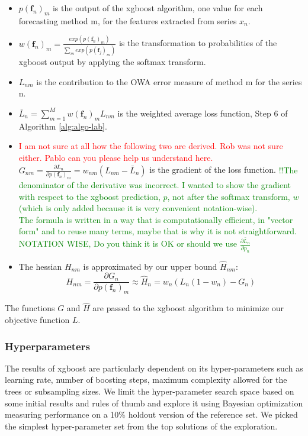 \documentclass[11pt,a4paper,]{article}
\providecommand{\tightlist}{%
  \setlength{\itemsep}{0pt}\setlength{\parskip}{0pt}}
\theoremstyle{definition}
\theoremstyle{definition}
\theoremstyle{definition}
\theoremstyle{remark}
\begin{document}
\begin{itemize}
\tightlist
\item
  \(p(\bm{f}_n)_m\) is the output of the xgboost algorithm, one value
  for each forecasting method m, for the features extracted from series
  \(x_n\).
\item
  \(w(\bm{f}_n)_{m} = \frac{exp(p(\bm{f}_n)_m)}{ \sum_m exp(p(\bm{f}_j)_m)}\)
  is the transformation to probabilities of the xgboost output by
  applying the softmax transform.
\item
  \(L_{nm}\) is the contribution to the OWA error measure of method m
  for the series n.
\item
  \(\bar{L}_n = \sum_{m=1}^M w(\bm{f}_n)_m L_{nm}\) is the weighted
  average loss function, Step 6 of Algorithm \ref{alg:algo-lab}.
\item
  \textcolor{red}{I am not sure at all how the following two are derived. Rob was not sure either. Pablo can you please help us understand here.}
  \(G_{nm} = \frac{\partial{\bar{L}_n}}{\partial{p(\bm{f}_n)_m}} = w_{nm}(L_{nm} - \bar{L}_n)\)
  is the gradient of the loss function.
  \textcolor{green}{!!The denominator of the derivative was incorrect. I wanted to show the gradient with respect to the xgboost prediction, $p$, not after the softmax transform, $w$ (which is only added because it is very convenient notation-wise).
    \\The formula is written in a way that is computationally efficient, in "vector form" and to reuse many terms, maybe that is why it is not straightforward.
    \\ NOTATION WISE, Do you think it is OK or should we use
    $\frac{\partial{\bar{L}_n}}{\partial{p_n}}$}
\item
  The hessian \(H_{nm}\) is approximated by our upper bound
  \(\hat{H}_{nm}\):
  \[ H_{nm} = \frac{\partial{G_n}}{\partial{p(\bm{f}_n)_m}} \approx \hat{H}_n = w_n(L_n(1-w_n) - G_n)  \]
\end{itemize}

The functions \(G\) and \(\hat{H}\) are passed to the xgboost algorithm
to minimize our objective function \(L\).

\subsubsection{Hyperparameters}\label{hyperparameters}

The results of xgboost are particularly dependent on its
hyper-parameters such as learning rate, number of boosting steps,
maximum complexity allowed for the trees or subsampling sizes. We limit
the hyper-parameter search space based on some initial results and rules
of thumb and explore it using Bayesian optimization
\autocite[implemented in the \texttt{rBayesianOptimization} R
package][]{rBayesianOptimization} measuring performance on a 10\%
holdout version of the reference set. We picked the simplest
hyper-parameter set from the top solutions of the exploration.
\end{document}
